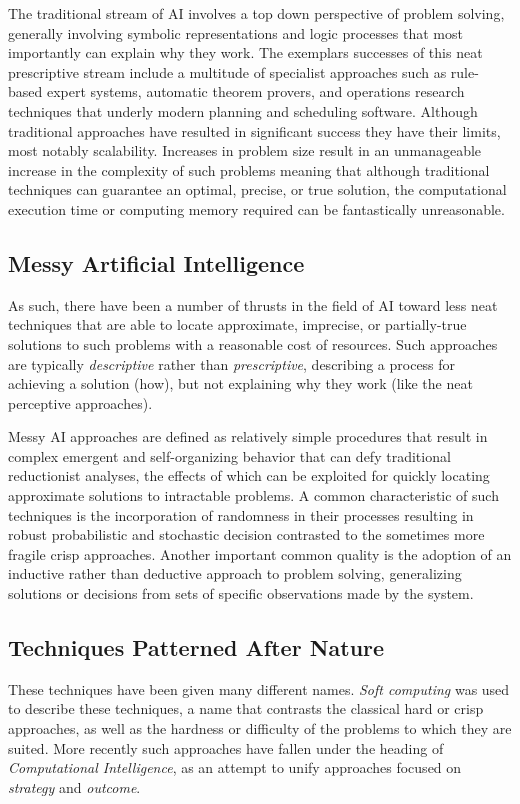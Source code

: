 The traditional stream of AI involves a top down perspective of problem solving, generally involving symbolic representations and logic processes that most importantly can explain why they work. The exemplars successes of this neat prescriptive stream include a multitude of specialist approaches such as rule-based expert systems, automatic theorem provers, and operations research techniques that underly modern planning and scheduling software. Although traditional approaches have resulted in significant success they have their limits, most notably scalability. Increases in problem size result in an unmanageable increase in the complexity of such problems meaning that although traditional techniques can guarantee an optimal, precise, or true solution, the computational execution time or computing memory required can be fantastically unreasonable.

\subsection{Messy Artificial Intelligence}
As such, there have been a number of thrusts in the field of AI toward less neat techniques that are able to locate approximate, imprecise, or partially-true solutions to such problems with a reasonable cost of resources. Such approaches are typically \emph{descriptive} rather than \emph{prescriptive}, describing a process for achieving a solution (how), but not explaining why they work (like the neat perceptive approaches). 

Messy AI approaches are defined as relatively simple procedures that result in complex emergent and self-organizing behavior that can defy traditional reductionist analyses, the effects of which can be exploited for quickly locating approximate solutions to intractable problems. A common characteristic of such techniques is the incorporation of randomness in their processes resulting in robust probabilistic and stochastic decision contrasted to the sometimes more fragile crisp approaches. Another important common quality is the adoption of an inductive rather than deductive approach to problem solving, generalizing solutions or decisions from sets of specific observations made by the system.

\subsection{Techniques Patterned After Nature}
These techniques have been given many different names. \emph{Soft computing} was used to describe these techniques, a name that contrasts the classical hard or crisp approaches, as well as the hardness or difficulty of the problems to which they are suited. More recently such approaches have fallen under the heading of \emph{Computational Intelligence}, as an attempt to unify approaches focused on \emph{strategy} and \emph{outcome}. 

